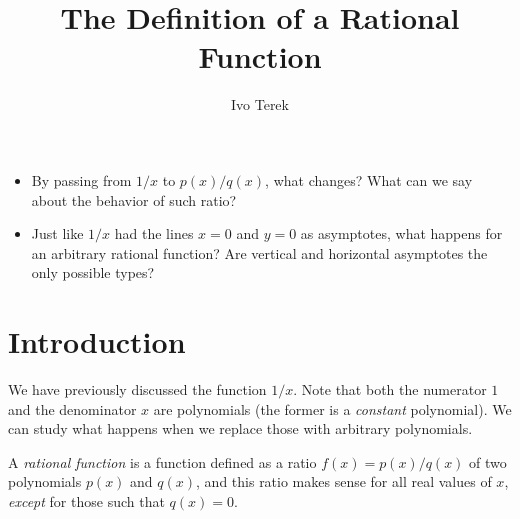 \documentclass{ximera}
\author{Ivo Terek}
\title{The Definition of a Rational Function}
\begin{document}
\begin{abstract}
\end{abstract}
\maketitle



\begin{motivatingQuestions}\begin{itemize}
\item By passing from $1/x$ to $p(x)/q(x)$, what changes? What can we say about the behavior of such ratio?
\item Just like $1/x$ had the lines $x=0$ and $y=0$ as asymptotes, what happens for an arbitrary rational function? Are vertical and horizontal asymptotes the only possible types?
\end{itemize}\end{motivatingQuestions}



\section{Introduction}

We have previously discussed the function $1/x$. Note that both the numerator $1$ and the denominator $x$ are polynomials (the former is a \emph{constant} polynomial). We can study what happens when we replace those with arbitrary polynomials.

\begin{definition}
  A \emph{rational function} is a function defined as a ratio $f(x) = p(x)/q(x)$ of two polynomials $p(x)$ and $q(x)$, and this ratio makes sense for all real values of $x$, \emph{except} for those such that $q(x) = 0$.
\end{definition}
\end{document}
